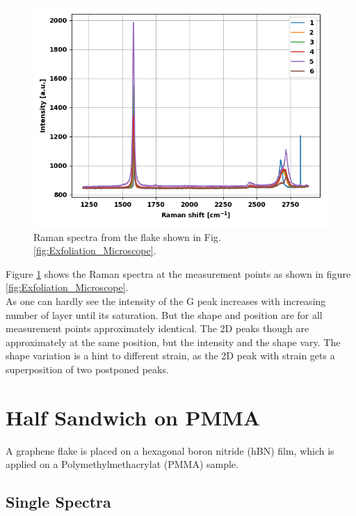 \documentclass[12pt,a4paper]{article}
\begin{document}
\begin{figure}
\centering
\includegraphics[scale=0.5]{Bilder/Exfoliation/2_mono_bi_tri_flake_all.PNG}
\caption{Raman spectra from the flake shown in Fig. \ref{fig:Exfoliation_Microscope}.}
\label{fig:Exfoliation_Spectra}
\end{figure}

Figure \ref{fig:Exfoliation_Spectra} shows the Raman spectra at the measurement points as shown in figure \ref{fig:Exfoliation_Microscope}. \\
As one can hardly see the intensity of the G peak increases with increasing number of layer until its saturation. But the shape and position are for all measurement points approximately identical. The 2D peaks though are approximately at the same position, but the intensity and the shape vary. The shape variation is a hint to different strain, as the 2D peak with strain gets a superposition of two postponed peaks. 



\section{Half Sandwich on PMMA}
A graphene flake is placed on a hexagonal boron nitride (hBN) film, which is applied on a Polymethylmethacrylat (PMMA) sample. 

\subsection{Single Spectra}
\end{document}
